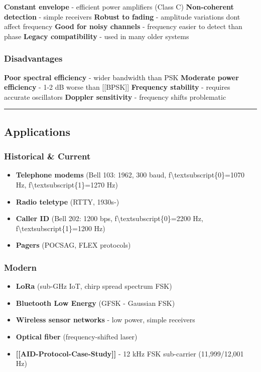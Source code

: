 \textbf{Constant envelope} - efficient power amplifiers (Class C)
\textbf{Non-coherent detection} - simple receivers \textbf{Robust to
fading} - amplitude variations don\textquotesingle t affect frequency
\textbf{Good for noisy channels} - frequency easier to detect than phase
\textbf{Legacy compatibility} - used in many older systems

\subsubsection{Disadvantages}\label{disadvantages}

\textbf{Poor spectral efficiency} - wider bandwidth than PSK
\textbf{Moderate power efficiency} - 1-2 dB worse than {[}{[}BPSK{]}{]}
\textbf{Frequency stability} - requires accurate oscillators
\textbf{Doppler sensitivity} - frequency shifts problematic

\begin{center}\rule{0.5\linewidth}{0.5pt}\end{center}

\subsection{\texorpdfstring{
Applications}{ Applications}}\label{applications}

\subsubsection{Historical \& Current}\label{historical-current}

\begin{itemize}
\tightlist
\item
  \textbf{Telephone modems} (Bell 103: 1962, 300 baud,
  f\textbackslash textsubscript\{0\}=1070 Hz,
  f\textbackslash textsubscript\{1\}=1270 Hz)
\item
  \textbf{Radio teletype} (RTTY, 1930s-)
\item
  \textbf{Caller ID} (Bell 202: 1200 bps,
  f\textbackslash textsubscript\{0\}=2200 Hz,
  f\textbackslash textsubscript\{1\}=1200 Hz)
\item
  \textbf{Pagers} (POCSAG, FLEX protocols)
\end{itemize}

\subsubsection{Modern}\label{modern}

\begin{itemize}
\tightlist
\item
  \textbf{LoRa} (sub-GHz IoT, chirp spread spectrum FSK)
\item
  \textbf{Bluetooth Low Energy} (GFSK - Gaussian FSK)
\item
  \textbf{Wireless sensor networks} - low power, simple receivers
\item
  \textbf{Optical fiber} (frequency-shifted laser)
\item
  \textbf{{[}{[}AID-Protocol-Case-Study{]}{]}} - 12 kHz FSK sub-carrier
  (11,999/12,001 Hz)
\end{itemize}

